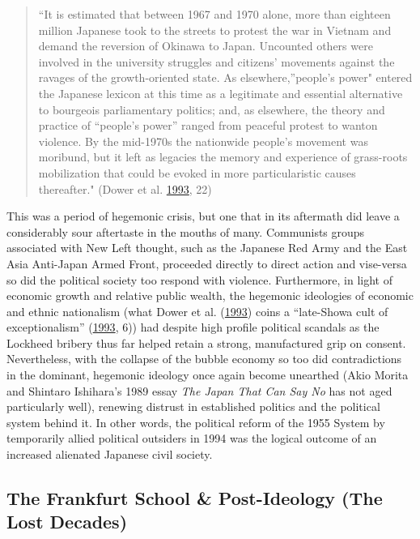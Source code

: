 \documentclass[10pt,british,A4paper,,openany]{memoir}
\begin{document}
\begin{quote}
``It is estimated that between 1967 and 1970 alone, more than eighteen
million Japanese took to the streets to protest the war in Vietnam and
demand the reversion of Okinawa to Japan. Uncounted others were involved
in the university struggles and citizens' movements against the ravages
of the growth-oriented state. As elsewhere,''people's power" entered the
Japanese lexicon at this time as a legitimate and essential alternative
to bourgeois parliamentary politics; and, as elsewhere, the theory and
practice of ``people's power'' ranged from peaceful protest to wanton
violence. By the mid-1970s the nationwide people's movement was
moribund, but it left as legacies the memory and experience of
grass-roots mobilization that could be evoked in more particularistic
causes thereafter." (Dower et al.
\protect\hyperlink{ref-dower_peace_1993}{1993}, 22)
\end{quote}

This was a period of hegemonic crisis, but one that in its aftermath did
leave a considerably sour aftertaste in the mouths of many. Communists
groups associated with New Left thought, such as the Japanese Red Army
and the East Asia Anti-Japan Armed Front, proceeded directly to direct
action and vise-versa so did the political society too respond with
violence. Furthermore, in light of economic growth and relative public
wealth, the hegemonic ideologies of economic and ethnic nationalism
(what Dower et al. (\protect\hyperlink{ref-dower_peace_1993}{1993})
coins a ``late-Showa cult of exceptionalism''
(\protect\hyperlink{ref-dower_peace_1993}{1993}, 6)) had despite high
profile political scandals as the Lockheed bribery thus far helped
retain a strong, manufactured grip on consent. Nevertheless, with the
collapse of the bubble economy so too did contradictions in the
dominant, hegemonic ideology once again become unearthed (Akio Morita
and Shintaro Ishihara's 1989 essay \emph{The Japan That Can Say No} has
not aged particularly well), renewing distrust in established politics
and the political system behind it. In other words, the political reform
of the 1955 System by temporarily allied political outsiders in 1994 was
the logical outcome of an increased alienated Japanese civil society.

\subsection{The Frankfurt School \& Post-Ideology (The Lost
Decades)}\label{the-frankfurt-school-post-ideology-the-lost-decades}
\end{document}
